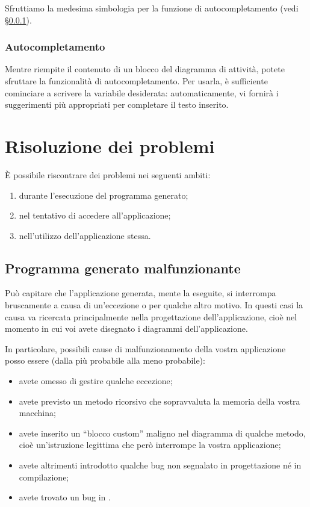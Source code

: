 Sfruttiamo la medesima simbologia per la funzione di autocompletamento (vedi §\ref{sec:autocomplete}).

\subsubsection{Autocompletamento} \label{sec:autocomplete}
Mentre riempite il contenuto di un blocco del diagramma di attività, potete sfruttare la funzionalità di autocompletamento. Per usarla, è sufficiente cominciare a scrivere la variabile desiderata: automaticamente, \proj{} vi fornirà i suggerimenti più appropriati per completare il testo inserito.




\section{Risoluzione dei problemi} \label{sec:problemi}

È possibile riscontrare dei problemi nei seguenti ambiti:
\begin{enumerate}
	\item durante l'esecuzione del programma generato;
	\item nel tentativo di accedere all'applicazione;
	\item nell'utilizzo dell'applicazione stessa.
\end{enumerate}



\subsection{Programma generato malfunzionante} \label{sec:mal_gen}

Può capitare che l'applicazione generata, mente la eseguite, si interrompa bruscamente a causa di un'eccezione o per qualche altro motivo. In questi casi la causa va ricercata principalmente nella progettazione dell'applicazione, cioè nel momento in cui voi avete disegnato i diagrammi dell'applicazione.

In particolare, possibili cause di malfunzionamento della vostra applicazione posso essere (dalla più probabile alla meno probabile):
\begin{itemize}
	\item avete omesso di gestire qualche eccezione;
	\item avete previsto un metodo ricorsivo che sopravvaluta la memoria della vostra macchina;
	\item avete inserito un “blocco custom” maligno nel diagramma di qualche metodo, cioè un'istruzione legittima che però interrompe la vostra applicazione;
	\item avete altrimenti introdotto qualche bug non segnalato in progettazione né in compilazione;
	\item avete trovato un bug in \proj.
\end{itemize}




